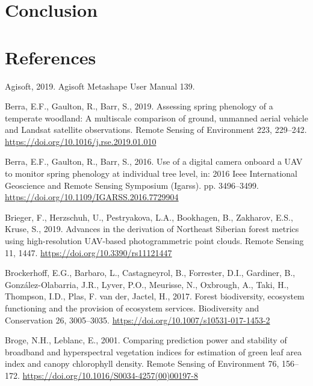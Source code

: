 \documentclass[]{article}
\begin{document}
\hypertarget{conclusion}{%
\section{Conclusion}\label{conclusion}}

\hypertarget{references}{%
\section*{References}\label{references}}

\hypertarget{refs}{}
\leavevmode\hypertarget{ref-Agisoft2019}{}%
Agisoft, 2019. Agisoft Metashape User Manual 139.

\leavevmode\hypertarget{ref-Berra2019}{}%
Berra, E.F., Gaulton, R., Barr, S., 2019. Assessing spring phenology of
a temperate woodland: A multiscale comparison of ground, unmanned aerial
vehicle and Landsat satellite observations. Remote Sensing of
Environment 223, 229--242.
\url{https://doi.org/10.1016/j.rse.2019.01.010}

\leavevmode\hypertarget{ref-Berra2016}{}%
Berra, E.F., Gaulton, R., Barr, S., 2016. Use of a digital camera
onboard a UAV to monitor spring phenology at individual tree level, in:
2016 Ieee International Geoscience and Remote Sensing Symposium
(Igarss). pp. 3496--3499.
\url{https://doi.org/10.1109/IGARSS.2016.7729904}

\leavevmode\hypertarget{ref-Brieger2019a}{}%
Brieger, F., Herzschuh, U., Pestryakova, L.A., Bookhagen, B., Zakharov,
E.S., Kruse, S., 2019. Advances in the derivation of Northeast Siberian
forest metrics using high-resolution UAV-based photogrammetric point
clouds. Remote Sensing 11, 1447.
\url{https://doi.org/10.3390/rs11121447}

\leavevmode\hypertarget{ref-Brockerhoff2017}{}%
Brockerhoff, E.G., Barbaro, L., Castagneyrol, B., Forrester, D.I.,
Gardiner, B., González-Olabarria, J.R., Lyver, P.O., Meurisse, N.,
Oxbrough, A., Taki, H., Thompson, I.D., Plas, F. van der, Jactel, H.,
2017. Forest biodiversity, ecosystem functioning and the provision of
ecosystem services. Biodiversity and Conservation 26, 3005--3035.
\url{https://doi.org/10.1007/s10531-017-1453-2}

\leavevmode\hypertarget{ref-Broge2001}{}%
Broge, N.H., Leblanc, E., 2001. Comparing prediction power and stability
of broadband and hyperspectral vegetation indices for estimation of
green leaf area index and canopy chlorophyll density. Remote Sensing of
Environment 76, 156--172.
\url{https://doi.org/10.1016/S0034-4257(00)00197-8}
\end{document}
